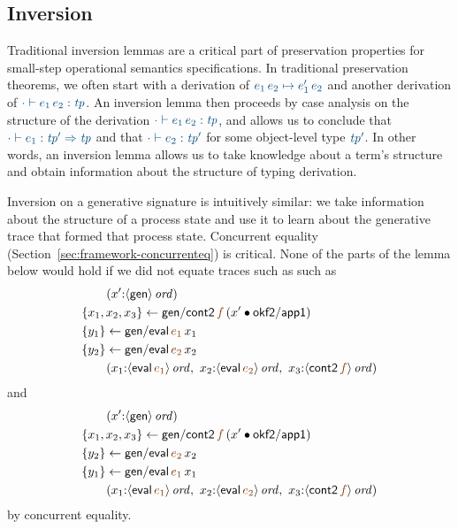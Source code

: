 \subsection{Inversion}\label{sec:inversion-genorder}

Traditional inversion lemmas are a critical part of preservation
properties for small-step operational semantics specifications. In 
traditional preservation theorems, we often start with a derivation of
$\obj{e_1\,e_2 \mapsto e_1'\,e_2}$ and another derivation of
$\obj{\cdot \vdash e_1\,e_2 : {\it tp}}$. An inversion lemma then proceeds
by case analysis on the structure of the derivation 
$\obj{\cdot \vdash e_1\,e_2 : {\it tp}}$, and allows us to conclude that
$\obj{\cdot \vdash e_1 : {\it tp'} \Rightarrow {\it tp}}$
and that $\obj{\cdot \vdash e_2 : {\it tp'} }$ for some object-level
type $\obj{\it tp'}$.  In other words, an inversion lemma allows us to 
take knowledge about a term's structure and obtain information about 
the structure of typing derivation. 

Inversion on a generative signature is intuitively similar: we take
information about the structure of a process state and use it to learn
about the generative trace that formed that process state. Concurrent
equality (Section~\ref{sec:framework-concurrenteq}) is critical.
None of the parts of the lemma below would hold if we did not
equate traces such as such as
\begin{align*}
& \qquad (x'{:}\istrue{\susp{{\sf gen}}})
\\
& \trstep{x_1, x_2, x_3}{{\sf gen/cont2}\,\lf{f}\,(x' \fuse {\sf okf2/app1})}
\\
& \trstep{y_1}{{\sf gen/eval}\,\lf{e_1}\,x_1}
\\
& \trstep{y_2}{{\sf gen/eval}\,\lf{e_2}\,x_2}
\\
& \qquad (x_1{:}\istrue{\susp{{\sf eval}\,\lf{e_1}}}, ~
          x_2{:}\istrue{\susp{{\sf eval}\,\lf{e_2}}}, ~
          x_3{:}\istrue{\susp{{\sf cont2}\,\lf{f}}})
\end{align*}
and
\begin{align*}
& \qquad (x'{:}\istrue{\susp{{\sf gen}}})
\\
& \trstep{x_1, x_2, x_3}{{\sf gen/cont2}\,\lf{f}\,(x' \fuse {\sf okf2/app1})}
\\
& \trstep{y_2}{{\sf gen/eval}\,\lf{e_2}\,x_2}
\\
& \trstep{y_1}{{\sf gen/eval}\,\lf{e_1}\,x_1}
\\
& \qquad (x_1{:}\istrue{\susp{{\sf eval}\,\lf{e_1}}}, ~
          x_2{:}\istrue{\susp{{\sf eval}\,\lf{e_2}}}, ~
          x_3{:}\istrue{\susp{{\sf cont2}\,\lf{f}}})
\end{align*}
by concurrent equality. 

